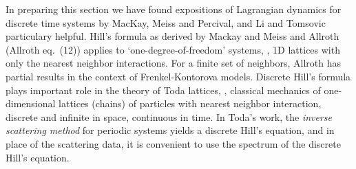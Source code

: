 In preparing this section we have found expositions of Lagrangian
dynamics for discrete time systems by MacKay, Meiss and
Percival, and Li and Tomsovic particulary
helpful.
Hill's formula as derived by Mackay and Meiss and
Allroth (Allroth eq.~(12)) applies to
`one-degree-of-freedom' systems, \ie, 1D lattices with only the nearest
neighbor interactions. For a finite set of neighbors,
Allroth has partial results in the
context of Frenkel-Kontorova models.
Discrete Hill's formula plays important role in the theory of Toda
lattices, \ie, classical mechanics of one-dimensional lattices
(chains) of particles with nearest neighbor interaction, discrete and
infinite in space, continuous in time. In Toda's work,
the {\em inverse scattering method} for periodic systems yields a
discrete Hill's equation, and in place of the scattering data, it is
convenient to use the spectrum of the discrete Hill's equation.
